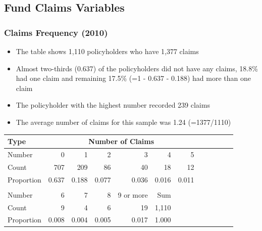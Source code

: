 \documentclass[serif,10pt]{beamer}
\begin{document}
\subsection{Fund Claims Variables}

\begin{frame}
\frametitle{Claims Frequency (2010)}
  \begin{itemize}
\item The table shows 1,110 policyholders who have 1,377 claims \vspace{2mm}
\item Almost two-thirds (0.637) of the policyholders did not have any claims,  18.8\% had one claim and remaining  17.5\% (=1 - 0.637 - 0.188) had more than one
claim \vspace{2mm}
\item The policyholder with the highest number recorded 239 claims \vspace{2mm}
\item The average number of claims for this sample was 1.24 (=1377/1110)
\end{itemize}
\begin{table}[htbp]
  \centering
    \begin{tabular}{l | rrrr rrrr r r |r}
    \hline
Type &    \multicolumn{6}{c}{Number of Claims} &\\ \hline
Number&  0 &  1  & 2 &  3   &4  & 5   \\ \hline
Count & 707& 209  &86 & 40  &18 & 12   \\
Proportion & 0.637 &      0.188 &      0.077 &      0.036 &      0.016 &      0.011       \\\hline
\\ \hline
Number&  6  & 7  & 8  & 9 or more & Sum\\ \hline
Count & 9 &  4  & 6  & 19 &1,110\\
Proportion &  0.008 &      0.004 &      0.005 &      0.017 &      1.000 \\
    \hline
    \end{tabular}
 \end{table}

\end{frame}
\end{document}
